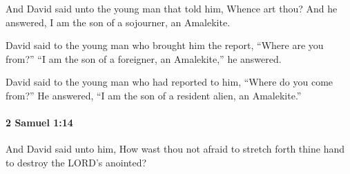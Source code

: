 			\begin{versebox}
					\item[BHS] 
					\item[ASV] And David said unto the young man that told him, Whence art thou? And he answered, I am the son of a sojourner, an Amalekite.
					\item[NIV] David said to the young man who brought him the report, “Where are you from?” “I am the son of a foreigner, an Amalekite,” he answered.
					\item[NRSV] David said to the young man who had reported to him, “Where do you come from?” He answered, “I am the son of a resident alien, an Amalekite.”
			\end{versebox}

		\paragraph{2 Samuel 1:14} %
			\label{2SAMUEL-1-14}

			And David said unto him, How wast thou not afraid to stretch forth thine hand to destroy the LORD’s anointed?

